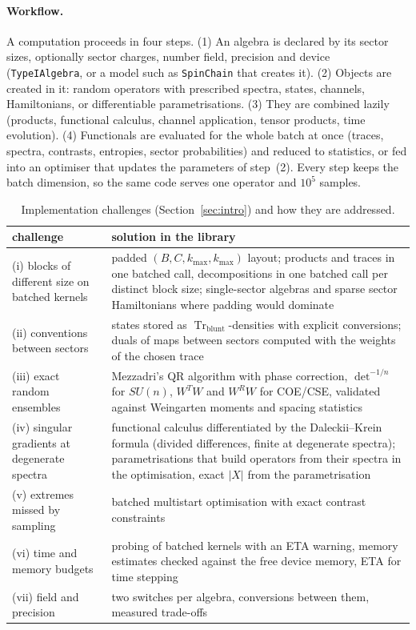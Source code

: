 \documentclass[11pt]{article}
\DeclareMathOperator{\Tr}{Tr}
\begin{document}
\paragraph{Workflow.} A computation proceeds in four steps. (1) An algebra is declared by its sector sizes,
optionally sector charges, number field, precision and device (\texttt{TypeIAlgebra}, or a model such as
\texttt{SpinChain} that creates it). (2) Objects are created in it: random operators with prescribed spectra,
states, channels, Hamiltonians, or differentiable parametrisations. (3) They are combined lazily (products,
functional calculus, channel application, tensor products, time evolution). (4) Functionals are evaluated for the
whole batch at once (traces, spectra, contrasts, entropies, sector probabilities) and reduced to statistics, or
fed into an optimiser that updates the parameters of step~(2). Every step keeps the batch dimension, so the same
code serves one operator and $10^5$ samples.

\begin{table}[h]
\centering\footnotesize
\begin{tabular}{p{}p{}}
\toprule
challenge & solution in the library\\
\midrule
(i) blocks of different size on batched kernels & padded $(B,C,k_{\max},k_{\max})$ layout; products and traces in one batched call, decompositions in one batched call per distinct block size; single-sector algebras and sparse sector Hamiltonians where padding would dominate\\
(ii) conventions between sectors & states stored as $\Tr_{\mathrm{blunt}}$-densities with explicit conversions;
duals of maps between sectors computed with the weights of the chosen trace\\
(iii) exact random ensembles & Mezzadri's QR algorithm with phase correction, $\det^{-1/n}$ for $SU(n)$, $W^TW$ and
$W^RW$ for COE/CSE, validated against Weingarten moments and spacing statistics\\
(iv) singular gradients at degenerate spectra & functional calculus differentiated by the Daleckii--Krein formula
(divided differences, finite at degenerate spectra); parametrisations that build operators from their spectra in the
optimisation, exact $|X|$ from the parametrisation\\
(v) extremes missed by sampling & batched multistart optimisation with exact contrast constraints\\
(vi) time and memory budgets & probing of batched kernels with an ETA warning, memory estimates checked against the
free device memory, ETA for time stepping\\
(vii) field and precision & two switches per algebra, conversions between them, measured trade-offs\\
\bottomrule
\end{tabular}
\caption{Implementation challenges (Section~\ref{sec:intro}) and how they are addressed.}
\label{tab:challenges}
\end{table}
\end{document}
